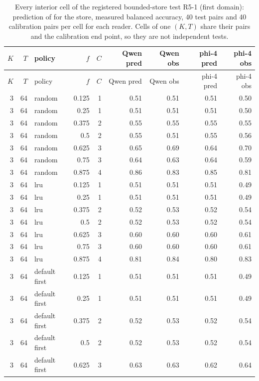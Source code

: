 \begin{longtable}{@{}rrlrrrrrr@{}}
\caption{Every interior cell of the registered bounded-store test R5-1 (first domain): prediction of  for the store, measured balanced accuracy, 40 test pairs and 40 calibration pairs per cell for each reader. Cells of one $(K,T)$ share their pairs and the calibration end point, so they are not independent tests.}\label{tab:cells-r51}\\
\toprule
$K$ & $T$ & policy & $f$ & $C$ & Qwen pred & Qwen obs & phi-4 pred & phi-4 obs \\
\midrule
\endfirsthead
\toprule
$K$ & $T$ & policy & $f$ & $C$ & Qwen pred & Qwen obs & phi-4 pred & phi-4 obs \\
\midrule
\endhead
3 & 64 & random & 0.125 & 1 & 0.51 & 0.51 & 0.51 & 0.50 \\
3 & 64 & random & 0.25 & 1 & 0.51 & 0.51 & 0.51 & 0.50 \\
3 & 64 & random & 0.375 & 2 & 0.55 & 0.55 & 0.55 & 0.55 \\
3 & 64 & random & 0.5 & 2 & 0.55 & 0.51 & 0.55 & 0.56 \\
3 & 64 & random & 0.625 & 3 & 0.65 & 0.69 & 0.64 & 0.70 \\
3 & 64 & random & 0.75 & 3 & 0.64 & 0.63 & 0.64 & 0.59 \\
3 & 64 & random & 0.875 & 4 & 0.86 & 0.83 & 0.85 & 0.81 \\
3 & 64 & lru & 0.125 & 1 & 0.51 & 0.51 & 0.51 & 0.49 \\
3 & 64 & lru & 0.25 & 1 & 0.51 & 0.51 & 0.51 & 0.49 \\
3 & 64 & lru & 0.375 & 2 & 0.52 & 0.53 & 0.52 & 0.54 \\
3 & 64 & lru & 0.5 & 2 & 0.52 & 0.53 & 0.52 & 0.54 \\
3 & 64 & lru & 0.625 & 3 & 0.60 & 0.60 & 0.60 & 0.61 \\
3 & 64 & lru & 0.75 & 3 & 0.60 & 0.60 & 0.60 & 0.61 \\
3 & 64 & lru & 0.875 & 4 & 0.81 & 0.84 & 0.80 & 0.83 \\
3 & 64 & default first & 0.125 & 1 & 0.51 & 0.51 & 0.51 & 0.49 \\
3 & 64 & default first & 0.25 & 1 & 0.51 & 0.51 & 0.51 & 0.49 \\
3 & 64 & default first & 0.375 & 2 & 0.52 & 0.53 & 0.52 & 0.54 \\
3 & 64 & default first & 0.5 & 2 & 0.52 & 0.53 & 0.52 & 0.54 \\
3 & 64 & default first & 0.625 & 3 & 0.63 & 0.63 & 0.62 & 0.64 \\

\end{longtable}

